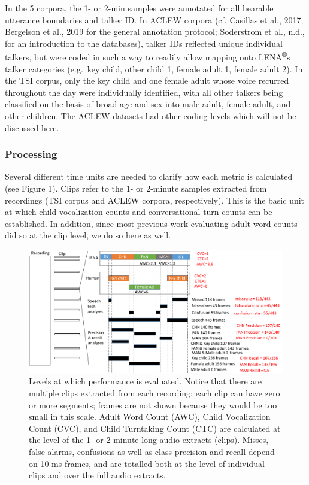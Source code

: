 \documentclass[english,table,man,floatsintext]{apa6}
\begin{document}
In the 5 corpora, the 1- or 2-min samples were annotated for all hearable utterance boundaries and talker ID. In ACLEW corpora (cf. Casillas et al., 2017; Bergelson et al., 2019 for the general annotation protocol; Soderstrom et al., n.d., for an introduction to the databases),
talker IDs reflected unique individual talkers, but were coded in such a way to readily allow mapping onto LENA\textsuperscript{®}s talker categories (e.g.~key child, other child 1, female adult 1, female adult 2). In the TSI corpus, only the key child and one female adult whose voice recurred throughout the day were individually identified, with all other talkers being classified on the basis of broad age and sex into male adult, female adult, and other children. The ACLEW datasets had other coding levels which will not be discussed here.

\hypertarget{processing}{%
\subsubsection{Processing}\label{processing}}

Several different time units are needed to clarify how each metric is calculated (see Figure 1). Clips refer to the 1- or 2-minute samples extracted from recordings (TSI corpus and ACLEW corpora, respectively). This is the basic unit at which child vocalization counts and conversational turn counts can be established. In addition, since most previous work evaluating adult word counts did so at the clip level, we do so here as well.

\begin{figure}
\centering
\includegraphics{fig_levels.pdf}
\caption{Levels at which performance is evaluated. Notice that there are multiple clips extracted from each recording; each clip can have zero or more segments; frames are not shown because they would be too small in this scale. Adult Word Count (AWC), Child Vocalization Count (CVC), and Child Turntaking Count (CTC) are calculated at the level of the 1- or 2-minute long audio extracts (clips). Misses, false alarms, confusions as well as class precision and recall depend on 10-ms frames, and are totalled both at the level of individual clips and over the full audio extracts.}
\end{figure}
\end{document}
